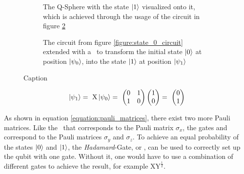 \begin{figure}[!h]
    \begin{subfigure}{.5\textwidth}
        \centering
        \scalebox{\blochwidth}{
            
        }
        \caption{The Q-Sphere with the state $\ket{1}$ visualized onto it, which is achieved through the usage of the circuit in figure \ref{figure:x_circuit}}
        \label{figure:state_1_q_sphere}
    \end{subfigure}
    \begin{subfigure}{.5\textwidth}
        \centering{}
        \caption{The circuit from figure \ref{figure:state_0_circuit} extended with a \xgate\ to transform the initial state $\ket{0}$ at position $\ket{\psi_0}$, into the state $\ket{1}$ at position $\ket{\psi_1}$}
        \label{figure:x_circuit}
    \end{subfigure}
    \caption{Caption}
    \label{fig:my_label}
\end{figure}

\begin{equation}
    \centering
    \begin{split}
        \ket{\psi_1} =\ \mathrm{X}\ket{\psi_0} =\ \begin{pmatrix} 0 & 1\\ 1 & 0\end{pmatrix}\begin{pmatrix}1 \\ 0\end{pmatrix} =\ \begin{pmatrix}0 \\ 1 \end{pmatrix}\\
    \end{split}
    \label{equation:state_1_equation}
\end{equation}

As shown in equation \ref{equation:pauli_matrices}, there exist two more Pauli matrices. Like the \xgate\ that corresponds to the Pauli matrix $\sigma_x$, the gates \ygate\cite{qiskit_ygate_nodate} and \zgate\cite{qiskit_zgate_nodate} correspond to the Pauli matrices $\sigma_y$ and $\sigma_z$.
\newpage
To achieve an equal probability of the states $\ket{0}$ and $\ket{1}$, the \emph{Hadamard}-Gate, or \hgate\cite{qiskit_hgate_nodate}, can be used to correctly set up the qubit with one gate. Without it, one would have to use a combination of different gates to achieve the result\cite{voorhoede_hadamard_nodate}, for example $\mathrm{XY}^{\frac{1}{2}}$.


